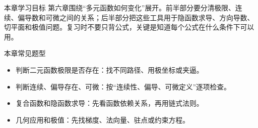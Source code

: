 
\begin{summarybox}{本章学习目标}
第六章围绕“多元函数如何变化”展开。前半部分要分清极限、连续、偏导数和可微之间的关系；后半部分把这些工具用于隐函数求导、方向导数、切平面和极值问题。复习时不要只背公式，关键是知道每个公式在什么条件下可以用。
\end{summarybox}

\begin{methodbox}{本章常见题型}
\begin{itemize}
  \item 判断二元函数极限是否存在：找不同路径、用极坐标或夹逼。
  \item 判断连续、偏导存在、可微：按“连续性、偏导、可微定义”逐项检查。
  \item 复合函数和隐函数求导：先看函数依赖关系，再用链式法则。
  \item 几何应用和极值：先找梯度、法向量、驻点或约束方程。
\end{itemize}
\end{methodbox}

